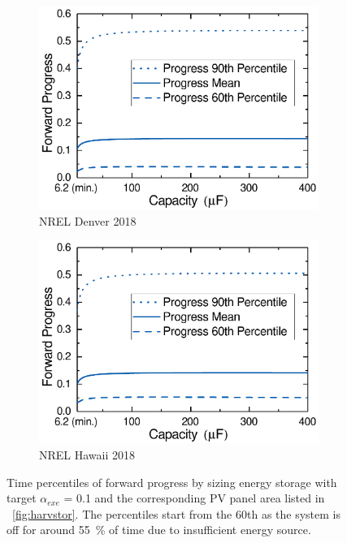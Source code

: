 \begin{figure}[!t]
\begin{subfigure}{0.49\columnwidth}
        \centering
        \includegraphics[width=\columnwidth]{ch4_sizingapproach/figures/HarvStorRan2Fig3}
        \caption{NREL Denver 2018}
        \label{fig:harvstorrange3}
    \end{subfigure}
    \begin{subfigure}{0.49\columnwidth}
        \centering
        \includegraphics[width=\columnwidth]{ch4_sizingapproach/figures/HarvStorRan2Fig4}
        \caption{NREL Hawaii 2018}
        \label{fig:harvstorrange4}
    \end{subfigure}
    \caption{Time percentiles of forward progress by sizing energy storage with target $\alpha_{exe}$ = 0.1 and the corresponding PV panel area listed in \figurename{~\ref{fig:harvstor}}. The percentiles start from the 60th as the system is off for around \SI{55}{\percent} of time due to insufficient energy source. }
    \label{fig:harvstorrange}
\end{figure}

